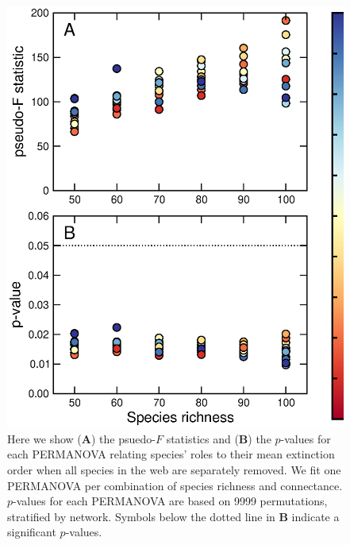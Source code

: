 \documentclass[12pt]{article}
\begin{document}
	\begin{figure}[h!]
		\caption{Here we show (\textbf{A}) the psuedo-$F$ statistics and (\textbf{B}) the $p$-values for each PERMANOVA relating species' roles to their mean extinction order when all species in the web are separately removed. We fit one PERMANOVA per combination of species richness and connectance. $p$-values for each PERMANOVA are based on 9999 permutations, stratified by network. Symbols below the dotted line in \textbf{B} indicate a significant $p$-values.}
		\label{permfig}
		\includegraphics[height=.75\textheight]{figures/extinction_order/permanova_summary_paper_full.eps}
		\end{figure}

\end{document}
